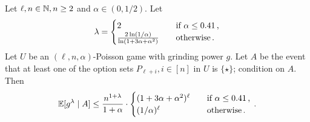  \begin{theorem}\label{thm:xor-game-private-election}
      Let $\ell, n \in \mathbb{N}, n \geq 2$ and $\alpha \in (0, 1/2)$. 
      Let
      \begin{equation}\label{eq:lambda-star-poisson}
          \lambda = \begin{cases}
              2 & \quad\text{if $\alpha \leq 0.41$\,,}\\
              \frac{2 \ln(1/\alpha)}{\ln(1+3\alpha+\alpha^2)} &\quad\text{otherwise\,.}
          \end{cases}
      \end{equation}
      Let $U$ be an $(\ell, n, \alpha)$-Poisson game with grinding power $g$. 
      Let $A$ be the event that 
      at least one of the option sets $P_{\ell + i}, i \in [n]$ in $U$ is $\{\star\}$; 
      condition on $A$. 
      Then 
      $$
          \operatorname{\mathbb{E}}[g^\lambda \mid A] 
          \leq \frac{n^{1 + \lambda} }{1+\alpha} 
          \cdot \begin{cases}
              (1 + 3 \alpha + \alpha^2)^{\ell} &\quad\text{if $\alpha \leq 0.41$\,,} \\
              (1/\alpha)^\ell &\quad\text{otherwise\,.}
          \end{cases}
          \,.
      $$
  \end{theorem}
